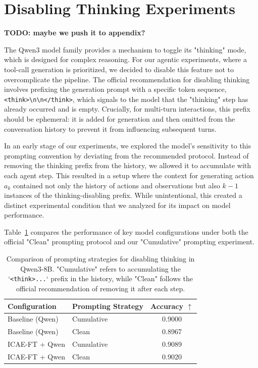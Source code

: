 \section{Disabling Thinking Experiments}
\label{sec:disabling_thinking}

\textbf{TODO: maybe we push it to appendix?}

The Qwen3 model family provides a mechanism to toggle its "thinking" mode, which is designed for complex reasoning.
For our agentic experiments, where a tool-call generation is prioritized, we decided to disable this feature not to overcomplicate the pipeline.
The official recommendation for disabling thinking involves prefixing the generation prompt with a specific token sequence, \texttt{<think>\textbackslash n\textbackslash n</think>}, which signals to the model that the "thinking" step has already occurred and is empty.
Crucially, for multi-turn interactions, this prefix should be ephemeral: it is added for generation and then omitted from the conversation history to prevent it from influencing subsequent turns.

In an early stage of our experiments, we explored the model's sensitivity to this prompting convention by deviating from the recommended protocol.
Instead of removing the thinking prefix from the history, we allowed it to accumulate with each agent step.
This resulted in a setup where the context for generating action \(a_k\) contained not only the history of actions and observations but also \(k-1\) instances of the thinking-disabling prefix.
While unintentional, this created a distinct experimental condition that we analyzed for its impact on model performance.

Table~\ref{tab:thinking_variants} compares the performance of key model configurations under both the official "Clean" prompting protocol and our "Cumulative" prompting experiment.

\begin{table}[h]
    \centering
    \small
    \caption{Comparison of prompting strategies for disabling thinking in Qwen3-8B. "Cumulative" refers to accumulating the `\texttt{<think>...}` prefix in the history, while "Clean" follows the official recommendation of removing it after each step.}
    \label{tab:thinking_variants}
    \begin{tabular}{llc}
        \toprule
        \textbf{Configuration} & \textbf{Prompting Strategy} & \textbf{Accuracy $\uparrow$} \\
        \midrule
        Baseline (Qwen) & Cumulative & 0.9000 \\
        Baseline (Qwen) & Clean & 0.8967 \\
        \addlinespace
        ICAE-FT + Qwen & Cumulative & 0.9089 \\
        ICAE-FT + Qwen & Clean & 0.9020 \\
        \bottomrule
    \end{tabular}
\end{table}

